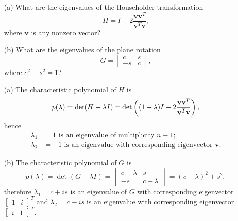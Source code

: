 \begin{pro}
  \begin{itemize}
  \item[(a)]
    What are the eigenvalues of the Householder transformation
    \begin{displaymath}
      H = I - 2 \frac{\mathbf{v}\mathbf{v}^T}{\mathbf{v}^T\mathbf{v}},
    \end{displaymath}
    where $\mathbf{v}$ is any nonzero vector?

  \item[(b)]
    What are the eigenvalues of the plane rotation
    \begin{displaymath}
      G =
      \begin{bmatrix}
        c & s \\
        -s & c
      \end{bmatrix},
    \end{displaymath}
    where $c^2+s^2=1$?
  \end{itemize}
\end{pro}

\begin{sol}
  \begin{itemize}
  \item[(a)]
    The characteristic polynomial of $H$ is
    \begin{displaymath}
      p(\lambda) = \det(H-\lambda I) =
      \det\left((1-\lambda)I - 2 \frac{\mathbf{v}\mathbf{v}^T}{\mathbf{v}^T\mathbf{v}}\right),
    \end{displaymath}
    hence
    \begin{align*}
      \lambda_1 &= 1 \text{ is an eigenvalue of multiplicity }n-1; \\
      \lambda_2 &= -1 \text{ is an eigenvalue with corresponding
                  eigenvector } \mathbf{v}.
    \end{align*}

  \item[(b)]
    The characteristic polynomial of $G$ is
    \begin{displaymath}
      p(\lambda) = \det(G-\lambda I) =
      \begin{vmatrix}
        c -\lambda & s \\
        -s & c-\lambda
      \end{vmatrix}
      = (c-\lambda)^2 + s^2,
    \end{displaymath}
    therefore $\lambda_1=c+is$ is an eigenvalue of $G$ with
    corresponding eigenvector $
    \begin{bmatrix}
      1 & i
    \end{bmatrix}^T
    $ and $\lambda_2=c-is$ is an eigenvalue with
    corresponding eigenvector $
    \begin{bmatrix}
      i & 1
    \end{bmatrix}^T
    $.
  \end{itemize}
\end{sol}
